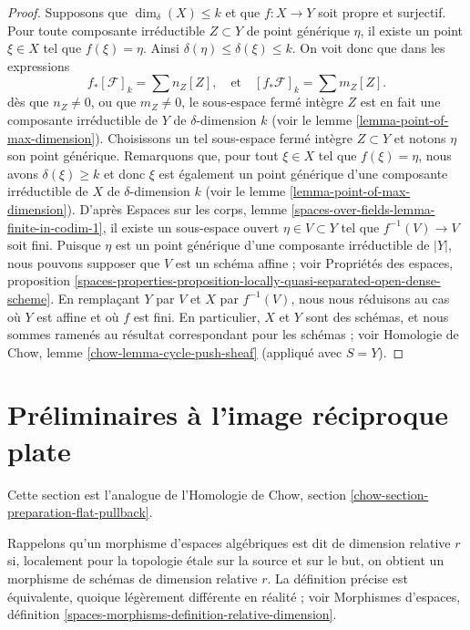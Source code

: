 \begin{proof}
\medskip\noindent
Supposons que $\dim_\delta(X) \leq k$ et que $f : X \to Y$ soit propre et
surjectif. Pour toute composante irréductible $Z \subset Y$ de point
générique $\eta$, il existe un point $\xi \in X$ tel que $f(\xi) = \eta$. Ainsi
$\delta(\eta) \leq \delta(\xi) \leq k$. On voit donc que dans les expressions
$$
f_*[\mathcal{F}]_k = \sum n_Z[Z],
\quad
\text{et}
\quad
[f_*\mathcal{F}]_k = \sum m_Z[Z].
$$
dès que $n_Z \not = 0$, ou que $m_Z \not = 0$, le sous-espace fermé
intègre $Z$ est en fait une composante irréductible de $Y$ de
$\delta$-dimension $k$ (voir le lemme \ref{lemma-point-of-max-dimension}).
Choisissons un tel sous-espace fermé intègre $Z \subset Y$ et notons $\eta$ son
point générique. Remarquons que, pour tout $\xi \in X$ tel que $f(\xi) = \eta$,
nous avons
$\delta(\xi) \geq k$ et donc $\xi$ est également un point générique d'une
composante irréductible de $X$ de $\delta$-dimension $k$ (voir le lemme
\ref{lemma-point-of-max-dimension}). D'après Espaces sur les corps, lemme
\ref{spaces-over-fields-lemma-finite-in-codim-1}, il existe un sous-espace
ouvert $\eta \in V \subset Y$ tel que $f^{-1}(V) \to V$ soit fini. Puisque
$\eta$ est un point générique d'une composante irréductible de $|Y|$, nous
pouvons supposer que $V$ est un schéma affine ; voir Propriétés des espaces,
proposition
\ref{spaces-properties-proposition-locally-quasi-separated-open-dense-scheme}.
En remplaçant $Y$ par $V$ et $X$ par $f^{-1}(V)$, nous nous réduisons au cas où
$Y$ est affine et où $f$ est fini. En particulier, $X$ et $Y$ sont des schémas,
et nous sommes ramenés au résultat correspondant pour les schémas ; voir
Homologie de Chow, lemme \ref{chow-lemma-cycle-push-sheaf} (appliqué avec $S = Y$).
\end{proof}













\section{Préliminaires à l'image réciproque plate}
\label{section-preparation-flat-pullback}

\noindent
Cette section est l'analogue de l'Homologie de Chow, section
\ref{chow-section-preparation-flat-pullback}.

\medskip\noindent
Rappelons qu'un morphisme d'espaces algébriques est dit de dimension relative
$r$ si, localement pour la topologie \'etale sur la source et sur le but, on
obtient un morphisme de schémas de dimension relative $r$. La définition
précise est équivalente, quoique légèrement différente en réalité ; voir
Morphismes d'espaces, définition
\ref{spaces-morphisms-definition-relative-dimension}.

